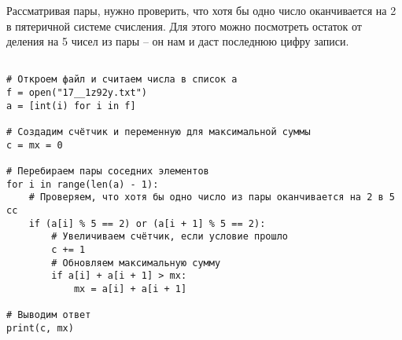 \documentclass[14pt,a4paper]{article}
\begin{document}
Рассматривая пары, нужно проверить, что хотя бы одно число оканчивается на 2 в пятеричной системе счисления. Для этого можно посмотреть остаток от деления на 5 чисел из пары -- он нам и даст последнюю цифру записи.

\begin{verbatim}

# Откроем файл и считаем числа в список a
f = open("17__1z92y.txt")
a = [int(i) for i in f]

# Создадим счётчик и переменную для максимальной суммы
c = mx = 0

# Перебираем пары соседних элементов
for i in range(len(a) - 1):
    # Проверяем, что хотя бы одно число из пары оканчивается на 2 в 5 сс
    if (a[i] % 5 == 2) or (a[i + 1] % 5 == 2):
        # Увеличиваем счётчик, если условие прошло
        c += 1
        # Обновляем максимальную сумму
        if a[i] + a[i + 1] > mx:
            mx = a[i] + a[i + 1]

# Выводим ответ
print(c, mx)

\end{verbatim}
\end{document}
